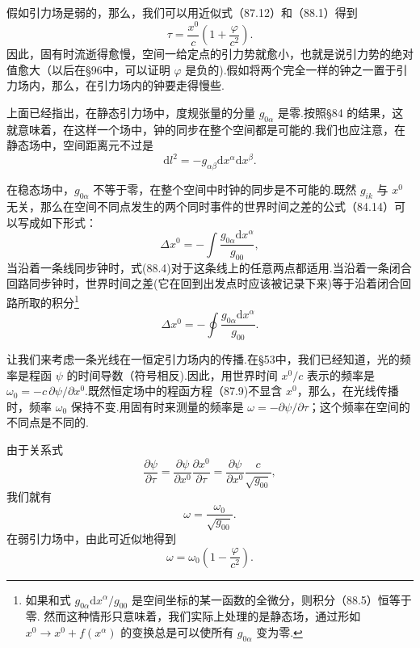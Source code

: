 假如引力场是弱的，那么，我们可以用近似式（87.12）和（88.1）得到
\begin{equation}
  \tau=\frac{x^0}{c}\left(1+\frac{\varphi}{c^2}\right).
\end{equation}
因此，固有时流逝得愈慢，空间一给定点的引力势就愈小，也就是说引力势的绝对值愈大（以后在§96中，可以证明 $\varphi$ 是负的).假如将两个完全一样的钟之一置于引力场内，那么，在引力场内的钟要走得慢些.

上面已经指出，在静态引力场中，度规张量的分量 $g_{0\alpha}$ 是零.按照§84 的结果，这就意味着，在这样一个场中，钟的同步在整个空间都是可能的.我们也应注意，在静态场中，空间距离元不过是
\begin{equation}
  \mathrm{d}l^2=-g_{\alpha\beta}\mathrm{d}x^{\alpha}\mathrm{d}x^{\beta}.
\end{equation}

在稳态场中，$g_{0\alpha}$ 不等于零，在整个空间中时钟的同步是不可能的.既然 $g_{ik}$ 与 $x^0$ 无关，那么在空间不同点发生的两个同时事件的世界时间之差的公式（84.14）可以写成如下形式：
\begin{equation}
  \Delta x^0=-\int\frac{g_{0\alpha}\mathrm{d}x^{\alpha}}{g_{00}},
\end{equation}
当沿着一条线同步钟时，式(88.4)对于这条线上的任意两点都适用.当沿着一条闭合回路同步钟时，世界时间之差(它在回到出发点时应该被记录下来)等于沿着闭合回路所取的积分\footnote{如果和式 $g_{0\alpha}\mathrm{d}x^{\alpha}/g_{00}$ 是空间坐标的某一函数的全微分，则积分（88.5）恒等于零. 然而这种情形只意味着，我们实际上处理的是静态场，通过形如 $x^0\to x^0+f(x^{\alpha})$ 的变换总是可以使所有 $g_{0\alpha}$ 变为零.}
\begin{equation}
  \Delta x^0=-\oint\frac{g_{0\alpha}\mathrm{d}x^{\alpha}}{g_{00}}.
\end{equation}

让我们来考虑一条光线在一恒定引力场内的传播.在§53中，我们已经知道，光的频率是程函 $\psi$ 的时间导数（符号相反).因此，用世界时间 $x^0/c$ 表示的频率是 $\omega_0=-c\,\partial\psi/\partial x^0$.既然恒定场中的程函方程（87.9)不显含 $x^0$，那么，在光线传播时，频率 $\omega_0$ 保持不变.用固有时来测量的频率是 $\omega=-\partial\psi/\partial\tau$；这个频率在空间的不同点是不同的.

由于关系式
\begin{equation*}
  \frac{\partial\psi}{\partial\tau}
  =\frac{\partial\psi}{\partial x^0}\frac{\partial x^0}{\partial\tau}
  =\frac{\partial\psi}{\partial x^0}\frac{c}{\sqrt{g_{00}}},
\end{equation*}
我们就有
\begin{equation}
  \omega=\frac{\omega_0}{\sqrt{g_{00}}}.
\end{equation}
在弱引力场中，由此可近似地得到
\begin{equation}
  \omega=\omega_0\left(1-\frac{\varphi}{c^2}\right).
\end{equation}

